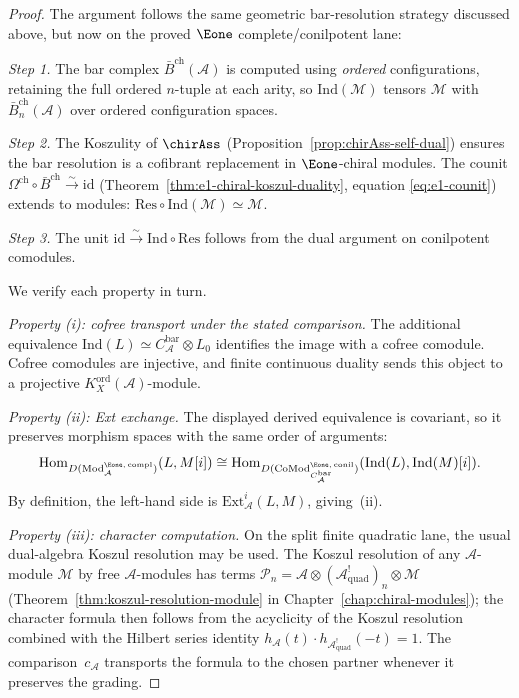 \begin{proof}
The argument follows the same geometric bar-resolution strategy
discussed above, but now on the proved $\Eone$
complete/conilpotent lane:

\emph{Step 1.}
The bar complex $\bar{B}^{\mathrm{ch}}(\mathcal{A})$ is computed
using \emph{ordered} configurations, retaining the full ordered
$n$-tuple at each arity, so
$\mathrm{Ind}(\mathcal{M})$ tensors $\mathcal{M}$ with
$\bar{B}^{\mathrm{ch}}_n(\mathcal{A})$ over ordered
configuration spaces.

\emph{Step 2.}
The Koszulity of $\chirAss$
(Proposition~\ref{prop:chirAss-self-dual}) ensures the bar
resolution is a cofibrant replacement in $\Eone$-chiral modules.
The counit $\Omega^{\mathrm{ch}} \circ \bar{B}^{\mathrm{ch}}
\xrightarrow{\sim} \mathrm{id}$
(Theorem~\ref{thm:e1-chiral-koszul-duality}, equation
\eqref{eq:e1-counit}) extends to modules:
$\mathrm{Res} \circ \mathrm{Ind}(\mathcal{M}) \simeq \mathcal{M}$.

\emph{Step 3.}
The unit
$\mathrm{id} \xrightarrow{\sim}
\mathrm{Ind} \circ \mathrm{Res}$
follows from the dual argument on conilpotent comodules.

We verify each property in turn.

\emph{Property (i): cofree transport under the stated comparison.}
The additional equivalence
$\mathrm{Ind}(L)\simeq
C_{\mathcal A}^{\mathrm{bar}}\otimes L_0$ identifies the image with a
cofree comodule.  Cofree comodules are injective, and finite continuous
duality sends this object to a projective
$K_X^{\mathrm{ord}}(\mathcal A)$-module.

\emph{Property (ii): Ext exchange.}
The displayed derived equivalence is covariant, so it preserves
morphism spaces with the same order of arguments:
\[
\operatorname{Hom}_{D(\mathrm{Mod}^{\Eone,\,\mathrm{compl}}_{\mathcal{A}})}
(L, M[i])
\cong
\operatorname{Hom}_{D(\mathrm{CoMod}^{\Eone,\,\mathrm{conil}}_{C_{\mathcal{A}}^{\mathrm{bar}}})}
(\mathrm{Ind}(L), \mathrm{Ind}(M)[i]).
\]
By definition, the left-hand side is
$\mathrm{Ext}^i_{\mathcal{A}}(L,M)$, giving~(ii).

\emph{Property (iii): character computation.}
On the split finite quadratic lane, the usual dual-algebra Koszul
resolution may be used.  The Koszul resolution of any
$\mathcal{A}$-module $\mathcal{M}$ by free
$\mathcal{A}$-modules has terms
$\mathcal{P}_n = \mathcal{A} \otimes
(\mathcal{A}^!_{\mathrm{quad}})_n
\otimes \mathcal{M}$
(Theorem~\ref{thm:koszul-resolution-module} in
Chapter~\ref{chap:chiral-modules}); the character formula then
follows from the acyclicity of the Koszul resolution combined
with the Hilbert series identity $h_{\mathcal{A}}(t) \cdot
h_{\mathcal{A}^!_{\mathrm{quad}}}(-t) = 1$.
The comparison~$c_{\mathcal A}$ transports the formula to the chosen
partner whenever it preserves the grading.
\end{proof}


